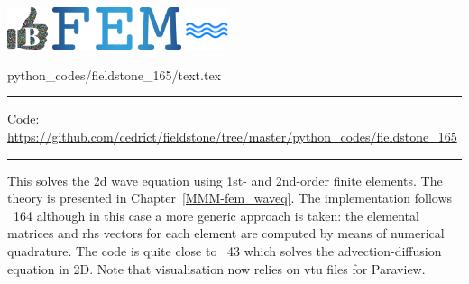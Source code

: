 \noindent
\includegraphics[height=1.25cm]{images/pictograms/benchmark}
\includegraphics[height=1.25cm]{images/pictograms/FEM}
\includegraphics[height=1.25cm]{images/pictograms/wave}


\begin{flushright} {\tiny {\color{gray} python\_codes/fieldstone\_165/text.tex}} \end{flushright}

%

\par\noindent\rule{\textwidth}{0.4pt}

\begin{center}
\inpython
{\small Code: \url{https://github.com/cedrict/fieldstone/tree/master/python_codes/fieldstone_165}}
\end{center}

\par\noindent\rule{\textwidth}{0.4pt}


This \stone solves the 2d wave equation using 1st- and 2nd-order finite elements. 
The theory is presented in Chapter~\ref{MMM-fem_waveq}.
The implementation follows \stone~164 although in this case 
a more generic approach is taken: the elemental matrices and rhs vectors for 
each element are computed by means of numerical quadrature.
The code is quite close to \stone~43 which solves the advection-diffusion equation in 2D.
Note that visualisation now relies on vtu files for Paraview.  

